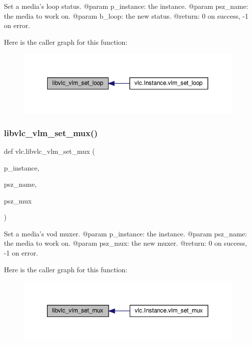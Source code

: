 \begin{DoxyVerb}Set a media's loop status.
@param p_instance: the instance.
@param psz_name: the media to work on.
@param b_loop: the new status.
@return: 0 on success, -1 on error.
\end{DoxyVerb}
 Here is the caller graph for this function\+:
\nopagebreak
\begin{figure}[H]
\begin{center}
\leavevmode
\includegraphics[width=349pt]{namespacevlc_a7084066e89dbf3c908a9674d892875a1_icgraph}
\end{center}
\end{figure}
\mbox{\label{namespacevlc_a34e533d7d8d01fefe3242f7de5773237}} 
\subsubsection{\texorpdfstring{libvlc\+\_\+vlm\+\_\+set\+\_\+mux()}{libvlc\_vlm\_set\_mux()}}
{\footnotesize\ttfamily def vlc.\+libvlc\+\_\+vlm\+\_\+set\+\_\+mux (\begin{DoxyParamCaption}\item[{}]{p\+\_\+instance,  }\item[{}]{psz\+\_\+name,  }\item[{}]{psz\+\_\+mux }\end{DoxyParamCaption})}

\begin{DoxyVerb}Set a media's vod muxer.
@param p_instance: the instance.
@param psz_name: the media to work on.
@param psz_mux: the new muxer.
@return: 0 on success, -1 on error.
\end{DoxyVerb}
 Here is the caller graph for this function\+:
\nopagebreak
\begin{figure}[H]
\begin{center}
\leavevmode
\includegraphics[width=350pt]{namespacevlc_a34e533d7d8d01fefe3242f7de5773237_icgraph}
\end{center}
\end{figure}
\mbox{\label{namespacevlc_a2e543e6f50ea55fcf49d57eeb79dc5cc}} 
